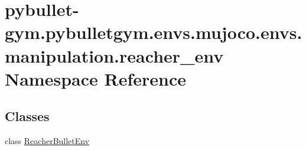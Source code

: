 \hypertarget{namespacepybullet-gym_1_1pybulletgym_1_1envs_1_1mujoco_1_1envs_1_1manipulation_1_1reacher__env}{}\section{pybullet-\/gym.pybulletgym.\+envs.\+mujoco.\+envs.\+manipulation.\+reacher\+\_\+env Namespace Reference}
\label{namespacepybullet-gym_1_1pybulletgym_1_1envs_1_1mujoco_1_1envs_1_1manipulation_1_1reacher__env}
\subsection*{Classes}
\begin{DoxyCompactItemize}
\item 
class \hyperlink{classpybullet-gym_1_1pybulletgym_1_1envs_1_1mujoco_1_1envs_1_1manipulation_1_1reacher__env_1_1_reacher_bullet_env}{Reacher\+Bullet\+Env}
\end{DoxyCompactItemize}
